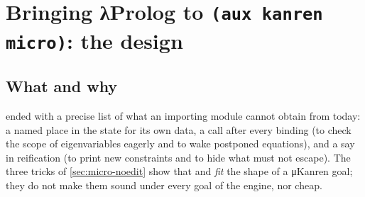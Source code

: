 \chapter{Bringing λProlog to \texorpdfstring{\texttt{(aux kanren micro)}}{(aux kanren micro)}: the design}\label{ch:design}

\section*{What and why}

 ended with a precise list of what an importing module cannot obtain from \micro{}
today: a named place in the state for its own data, a call after every binding (to check the scope of
eigenvariables eagerly and to wake postponed equations), and a say in reification (to print new
constraints and to hide what must not escape). The three tricks of \cref{sec:micro-noedit} show that
 and  \emph{fit} the shape of a μKanren goal; they do not make them sound under every
goal of the engine, nor cheap.

